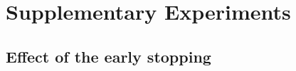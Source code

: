 \documentclass[runningheads]{llncs}
\begin{document}


\section{Supplementary Experiments}
\subsection{Effect of the early stopping}
\end{document}

